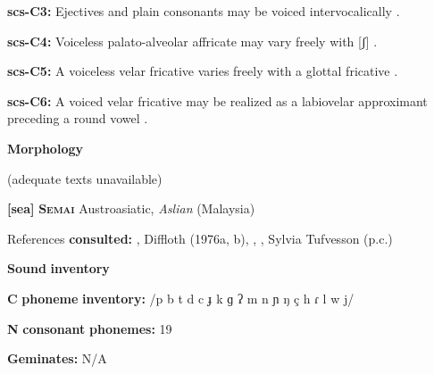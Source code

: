 \documentclass[output=paper]{langsci/langscibook}
\begin{document}
\begin{styleBody}
\textbf{scs-C3:} Ejectives and plain consonants may be voiced intervocalically \citep[31]{Rice1989}.
\end{styleBody}

\begin{styleBody}
\textbf{scs-C4:} Voiceless palato-alveolar affricate may vary freely with [ʃ] \citep[35]{Rice1989}.
\end{styleBody}

\begin{styleBody}
\textbf{scs-C5:} A voiceless velar fricative varies freely with a glottal fricative \citep[32]{Rice1989}.
\end{styleBody}

\begin{styleBody}
\textbf{scs-C6:} A voiced velar fricative may be realized as a labiovelar approximant preceding a round vowel \citep[32]{Rice1989}.
\end{styleBody}

\begin{styleBody}
\textbf{Morphology}
\end{styleBody}

\begin{styleBody}
(adequate texts unavailable)
\end{styleBody}

\begin{styleBody}
\textbf{[sea]}   \textbf{\textsc{Semai}  }  Austroasiatic, \textit{Aslian} (Malaysia)
\end{styleBody}

\begin{styleBody}
References \textbf{consulted:} \citet{Dentan2003}, Diffloth (1976a, b), \citet{Philips2007}, \citet{Sloan1988}, Sylvia Tufvesson (p.c.)
\end{styleBody}

\begin{styleBody}
\textbf{Sound} \textbf{inventory}
\end{styleBody}

\begin{styleBody}
\textbf{C} \textbf{phoneme} \textbf{inventory:} /p b t d c ɟ k ɡ ʔ m n ɲ ŋ ç h ɾ l w j/
\end{styleBody}

\begin{styleBody}
\textbf{N} \textbf{consonant} \textbf{phonemes:} 19
\end{styleBody}

\begin{styleBody}
\textbf{Geminates:} N/A
\end{styleBody}
\end{document}
